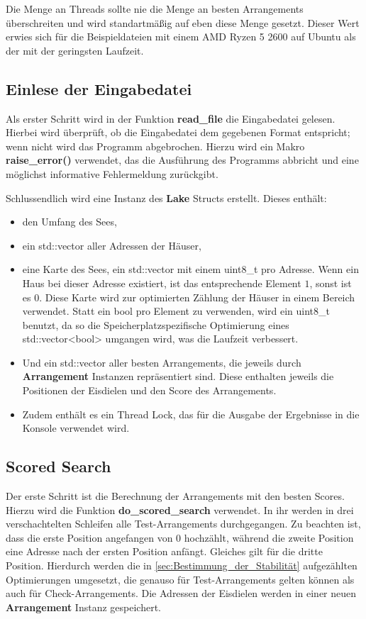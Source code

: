 \documentclass[a4paper,10pt,ngerman,captions=figureheading]{scrartcl}
\begin{document}
Die Menge an Threads sollte nie die Menge an besten Arrangements überschreiten und wird standartmäßig auf eben diese Menge gesetzt.
Dieser Wert erwies sich für die Beispieldateien mit einem AMD Ryzen 5 2600 auf Ubuntu als der mit der geringsten Laufzeit.

\subsection{Einlese der Eingabedatei}
\label{sec:Einlese_der_Eingabedatei}
Als erster Schritt wird in der Funktion \textbf{read\_file} die Eingabedatei gelesen.
Hierbei wird überprüft, ob die Eingabedatei dem gegebenen Format entspricht; wenn nicht wird das Programm abgebrochen.
Hierzu wird ein Makro \textbf{raise\_error()} verwendet, das die Ausführung des Programms abbricht und eine möglichst informative Fehlermeldung zurückgibt.

Schlussendlich wird eine Instanz des \textbf{Lake} Structs erstellt.
Dieses enthält:
\begin{itemize}
    \item den Umfang des Sees,
    \item ein std::vector aller Adressen der Häuser,
    \item eine Karte des Sees, ein std::vector mit einem uint8\_t pro Adresse.
          Wenn ein Haus bei dieser Adresse existiert, ist das entsprechende Element $1$, sonst ist es $0$.
          Diese Karte wird zur optimierten Zählung der Häuser in einem Bereich verwendet.
          Statt ein bool pro Element zu verwenden, wird ein uint8\_t benutzt, da so die Speicherplatzspezifische Optimierung eines std::vector<bool> umgangen wird, was die Laufzeit verbessert.
    \item Und ein std::vector aller besten Arrangements, die jeweils durch \textbf{Arrangement} Instanzen repräsentiert sind.
          Diese enthalten jeweils die Positionen der Eisdielen und den Score des Arrangements.
    \item Zudem enthält es ein Thread Lock, das für die Ausgabe der Ergebnisse in die Konsole verwendet wird.
\end{itemize}

\subsection{Scored Search}
\label{sec:Scored_Search}
Der erste Schritt ist die Berechnung der Arrangements mit den besten Scores.
Hierzu wird die Funktion \textbf{do\_scored\_search} verwendet.
In ihr werden in drei verschachtelten Schleifen alle Test-Arrangements durchgegangen.
Zu beachten ist, dass die erste Position angefangen von $0$ hochzählt, während die zweite Position eine Adresse nach der ersten Position anfängt.
Gleiches gilt für die dritte Position.
Hierdurch werden die in \autoref{sec:Bestimmung_der_Stabilität} aufgezählten Optimierungen umgesetzt, die genauso für Test-Arrangements gelten können als auch für Check-Arrangements.
Die Adressen der Eisdielen werden in einer neuen \textbf{Arrangement} Instanz gespeichert.
\end{document}

